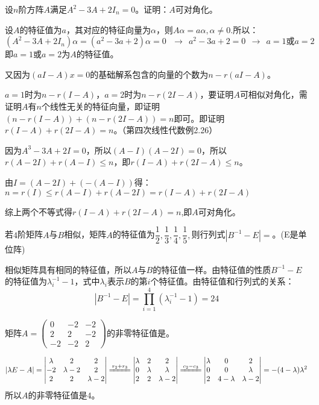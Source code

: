 \documentclass[a4paper]{report}
\begin{document}
\EX 设$n$阶方阵$A$满足$A^2-3A+2I_n=0$。证明：$A$可对角化。

\begin{zhengming}
设$A$的特征值为$a$，其对应的特征向量为$\alpha$，则$A\alpha=a\alpha,\alpha\neq0$.所以：
\begin{equation*}
(A^2-3A+2I_n)\alpha=(a^2-3a+2)\alpha=0~~~\rightarrow~~a^2-3a+2=0~~\rightarrow~~a=1\text{或}a=2
\end{equation*}
即$a=1$或$a=2$为$A$的特征值。

又因为$(aI-A)x=0$的基础解系包含的向量的个数为$n-r(aI-A)$。

$a=1$时为$n-r(I-A)$，$a=2$时为$n-r(2I-A)$，要证明$A$可相似对角化，需证明$A$有$n$个线性无关的特征向量，即证明$(n-r(I-A))+(n-r(2I-A))=n$即可。即证明$r(I-A)+r(2I-A)=n$。（第四次线性代数例2.26）

因为$A^3-3A+2I=0$，所以$(A-I)(A-2I)=0$，所以$r(A-2I)+r(A-I)\leq n$，即$r(I-A)+r(2I-A)\leq n$。

由$I=(A-2I)+(-(A-I))$得：$n=r(I)\leq r(A-I)+r(A-2I)=r(I-A)+r(2I-A)$

综上两个不等式得$r(I-A)+r(2I-A)=n$,即$A$可对角化。
\end{zhengming}

\EX 若$4$阶矩阵$A$与$B$相似，矩阵$A$的特征值为$
\dfrac{1}{2},\dfrac{1}{3},\dfrac{1}{4},\dfrac{1}{5},
$则行列式$|B^{-1}-E|=$\underline{\hphantom{~~~~~~~}}。(E是单位阵)

\begin{jie}
相似矩阵具有相同的特征值，所以$A$与$B$的特征值一样。由特征值的性质$B^{-1}-E$的特征值为$\lambda_{i}^{-1}-1$，式中$\lambda_i$表示$B$的第$i$个特征值。由特征值和行列式的关系：
\begin{equation*}
|B^{-1}-E|=\prod_{i=1}^{4}(\lambda_{i}^{-1}-1)=24
\end{equation*}
\end{jie}

\EX 矩阵$A=
\begin{pmatrix}
0&-2&-2\\
2&2&-2\\
-2&-2&2
\end{pmatrix}
$的非零特征值是\underline{\hphantom{~~~~~~~}}。

\begin{jie}
\begin{equation*}
|\lambda E-A|=
\begin{vmatrix}
\lambda&2&2\\
-2&\lambda-2&2\\
2&2&\lambda-2
\end{vmatrix}\xlongequal{r_2+r_3}
\begin{vmatrix}
\lambda&2&2\\
0&\lambda&\lambda\\
2&2&\lambda-2
\end{vmatrix}\xlongequal{c_2-c_3}
\begin{vmatrix}
\lambda&0&2\\
0&0&\lambda\\
2&4-\lambda&\lambda-2
\end{vmatrix}=-(4-\lambda)\lambda^{2}
\end{equation*}
所以$A$的非零特征值是$4$。
\end{jie}
\end{document}
